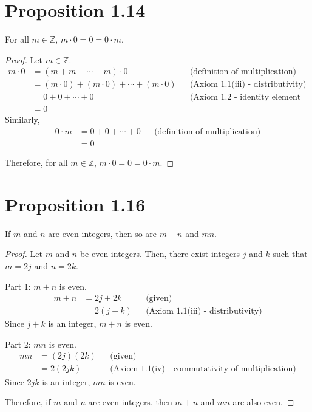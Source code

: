 \section*{Proposition 1.14}
For all $m \in \mathbb{Z}$, $m \cdot 0 = 0 = 0 \cdot m$.
\begin{proof}
    Let $m \in \mathbb{Z}$.
    \begin{align*}
        m \cdot 0 & = (m + m + \cdots + m) \cdot 0                     &  & \text{(definition of multiplication)}              \\
                  & = (m \cdot 0) + (m \cdot 0) + \cdots + (m \cdot 0) &  & \text{(Axiom 1.1(iii) - distributivity)}           \\
                  & = 0 + 0 + \cdots + 0                               &  & \text{(Axiom 1.2 - identity element for addition)} \\
                  & = 0
    \end{align*}
    Similarly,
    \begin{align*}
        0 \cdot m & = 0 + 0 + \cdots + 0 &  & \text{(definition of multiplication)} \\
                  & = 0
    \end{align*}

    Therefore, for all $m \in \mathbb{Z}$, $m \cdot 0 = 0 = 0 \cdot m$.
\end{proof}

\section*{Proposition 1.16}
If $m$ and $n$ are even integers, then so are $m+n$ and $mn$.
\begin{proof}
    Let $m$ and $n$ be even integers. Then, there exist integers $j$ and $k$ such that $m = 2j$ and $n = 2k$.

    Part 1: $m + n$ is even.
    \begin{align*}
        m + n & = 2j + 2k  &  & \text{(given)}                           \\
              & = 2(j + k) &  & \text{(Axiom 1.1(iii) - distributivity)}
    \end{align*}
    Since $j + k$ is an integer, $m + n$ is even.

    Part 2: $mn$ is even.
    \begin{align*}
        mn & = (2j)(2k) &  & \text{(given)}                                           \\
           & = 2(2jk)   &  & \text{(Axiom 1.1(iv) - commutativity of multiplication)}
    \end{align*}
    Since $2jk$ is an integer, $mn$ is even.

    Therefore, if $m$ and $n$ are even integers, then $m + n$ and $mn$ are also even.
\end{proof}

